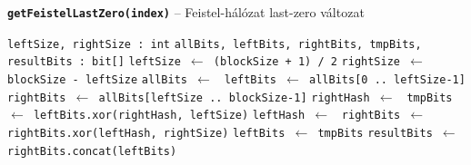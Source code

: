 \documentclass[
    parspace,
    noindent,
    nohyp,
]{elteiktdk}[2023/04/10]
\begin{document}
\begin{algorithm}[H]
\caption[Feistel-hálózat last-zero változat]{\textbf{\texttt{getFeistelLastZero(index)}} -- Feistel-hálózat last-zero változat}\label{algorithm:feistel}
\begin{algorithmic}[1]
    \scriptsize
    \State {}
    \State \texttt{leftSize, rightSize : int}
    \State \texttt{allBits, leftBits, rightBits, tmpBits, resultBits : bit[]}
    \State \texttt{leftSize $\gets$ (blockSize + 1) / 2}
    \State \texttt{rightSize $\gets$ blockSize - leftSize}
    \State \texttt{allBits $\gets$ }
    \State \texttt{leftBits $\gets$ allBits[0 .. leftSize-1]}
    \State \texttt{rightBits $\gets$ allBits[leftSize .. blockSize-1]}
        \State \texttt{rightHash $\gets$ }
        \State \texttt{tmpBits $\gets$ leftBits.xor(rightHash, leftSize)}
        \State \texttt{leftHash $\gets$ }
        \State \texttt{rightBits $\gets$ rightBits.xor(leftHash, rightSize)}
        \State \texttt{leftBits $\gets$ tmpBits}
    \EndFor
    \State \texttt{resultBits $\gets$ rightBits.concat(leftBits)}
    \State \texttt{}
\end{algorithmic}
\end{algorithm}


{}
\end{document}
